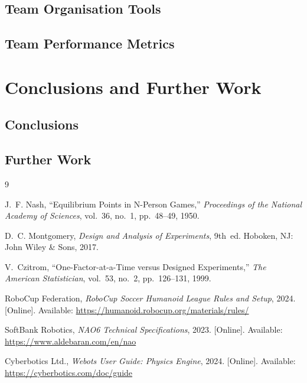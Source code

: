 \documentclass[12pt, a4paper]{report}
\begin{document}
\section{Team Organisation Tools}


\section{Team Performance Metrics}


\chapter{Conclusions and Further Work}

\section{Conclusions}


\section{Further Work}


\newpage
{}

\begin{thebibliography}{9}

J.~F. Nash, ``Equilibrium Points in N-Person Games,''
\textit{Proceedings of the National Academy of Sciences},
vol.~36, no.~1, pp.~48--49, 1950.

D.~C. Montgomery, \textit{Design and Analysis of Experiments},
9th~ed. Hoboken, NJ: John Wiley \& Sons, 2017.

V.~Czitrom, ``One-Factor-at-a-Time versus Designed Experiments,''
\textit{The American Statistician},
vol.~53, no.~2, pp.~126--131, 1999.

RoboCup Federation, \textit{RoboCup Soccer Humanoid League Rules and Setup},
2024. [Online]. Available: \url{https://humanoid.robocup.org/materials/rules/}

SoftBank Robotics, \textit{NAO6 Technical Specifications},
2023. [Online]. Available: \url{https://www.aldebaran.com/en/nao}

Cyberbotics Ltd., \textit{Webots User Guide: Physics Engine},
2024. [Online]. Available: \url{https://cyberbotics.com/doc/guide}

\end{thebibliography}
\end{document}
